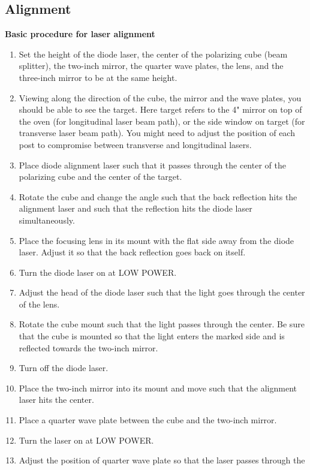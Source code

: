 \subsection{Alignment}

\noindent
{\bf{Basic procedure for laser alignment}}


\begin{enumerate} \setlength{\parskip}{0ex}
\item Set the height of the diode laser, the center of the polarizing
  cube (beam splitter), the two-inch mirror, the quarter wave plates, 
  the lens, and the three-inch mirror to be at the same height.
\item Viewing along the direction of the cube, the mirror and the wave 
  plates, you should be able to see the target.  Here target refers to
  the 4" mirror on top of the oven (for longitudinal laser beam path), 
  or the side window on target (for transverse laser beam path).  
  You might need to adjust the position of each post
  to compromise between transverse and longitudinal lasers.
\item Place diode alignment laser such that it passes through the center
  of the polarizing cube and the center of the target.
\item Rotate the cube and change the angle such that the back reflection
  hits the alignment laser and such that the reflection hits the diode
  laser simultaneously.
\item Place the focusing lens in its mount with the flat side away
  from the diode laser. Adjust it so that the back reflection goes back 
  on itself.
\item Turn the diode laser on at LOW POWER.
\item Adjust the head of the diode laser such that the light goes
  through the center of the lens.
\item Rotate the cube mount such that the light passes through the
  center. Be sure that the cube is mounted so that the light enters 
  the marked side and is reflected towards the two-inch mirror.
\item Turn off the diode laser.
\item Place the two-inch mirror into its mount and move such that the
  alignment laser hits the center.
\item Place a quarter wave plate between the cube and the two-inch
  mirror.
\item Turn the laser on at LOW POWER.
\item Adjust the position of quarter wave plate so that the laser passes through the

\end{enumerate}
